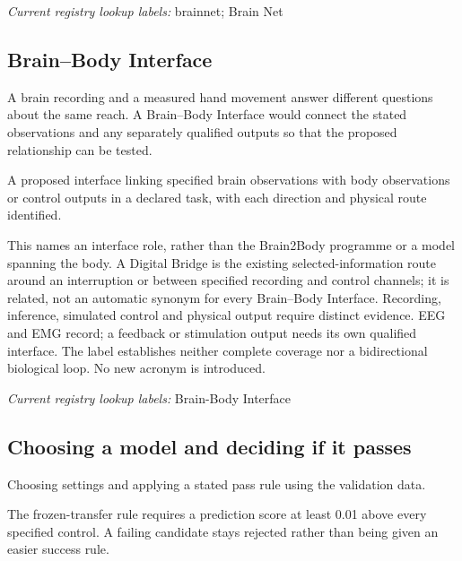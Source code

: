 \noindent\textit{Current registry lookup labels:} brainnet; Brain Net\par

\subsection*{Brain–Body Interface}
\noindent A brain recording and a measured hand movement answer different questions about the same reach. A Brain–Body Interface would connect the stated observations and any separately qualified outputs so that the proposed relationship can be tested.\par
\noindent A proposed interface linking specified brain observations with body observations or control outputs in a declared task, with each direction and physical route identified.\par
\begin{samepage}
\noindent This names an interface role, rather than the Brain2Body programme or a model spanning the body. A Digital Bridge is the existing selected-information route around an interruption or between specified recording and control channels; it is related, not an automatic synonym for every Brain–Body Interface. Recording, inference, simulated control and physical output require distinct evidence. EEG and EMG record; a feedback or stimulation output needs its own qualified interface. The label establishes neither complete coverage nor a bidirectional biological loop. No new acronym is introduced.\par\nopagebreak[4]

\end{samepage}


\noindent\textit{Current registry lookup labels:} Brain-Body Interface\par

\begin{samepage}
\subsection*{Choosing a model and deciding if it passes}
\noindent Choosing settings and applying a stated pass rule using the validation data.\par
\end{samepage}
\begin{samepage}
\noindent The frozen-transfer rule requires a prediction score at least 0.01 above every specified control. A failing candidate stays rejected rather than being given an easier success rule.\par\nopagebreak[4]

\end{samepage}


